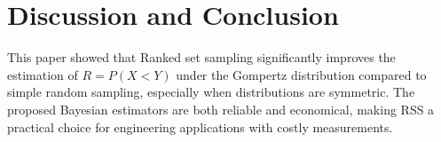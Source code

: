 \documentclass[twoside]{article}
\begin{document}
\section*{Discussion and Conclusion}   
This paper showed that Ranked set sampling significantly improves the estimation of $R=P(X<Y)$ under the Gompertz distribution compared to simple random sampling, especially when distributions are symmetric. The proposed Bayesian estimators are both reliable and economical, making RSS a practical choice for engineering applications with costly measurements.
\end{document}
